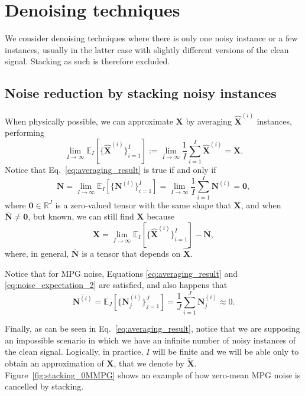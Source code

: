 \documentclass{article}
\begin{document}
\section{Denoising techniques}

We consider denoising techniques where there is only one noisy
instance or a few instances, usually in the latter case with slightly
different versions of the clean signal. Stacking as such is therefore
excluded.

\subsection{Noise reduction by stacking noisy instances}
When physically possible, we can approximate ${\mathbf X}$ by
averaging $\hat{\mathbf X}^{(i)}$ instances, performing
\begin{equation}
  \lim_{I \to \infty} \mathbb{E}_I\left[\{\hat{\mathbf X}^{(i)}\}_{i=1}^I\right] := \lim_{I \to \infty} \frac{1}{I} \sum_{i=1}^I \hat{\mathbf X}^{(i)} = {\mathbf X}.
  \label{eq:averaging_result}
\end{equation}
Notice that Eq.~\ref{eq:averaging_result} is true if and only if
\begin{equation}
  \overline{\mathbf N} = \lim_{I \to \infty}{\mathbb E}_I[\{{\mathbf N^{(i)}}\}_{i=1}^I]=\lim_{I \to \infty}\frac{1}{I} \sum_{i=1}^I {\mathbf N}^{(i)}={\mathbf 0},
  \label{eq:noise_expectation_2}
\end{equation}
where ${\mathbf 0}\in \mathbb{R}^J$ is a zero-valued tensor with the
same shape that $\mathbf{X}$, and when
$\overline{\mathbf N}\ne {\mathbf 0}$, but known, we can still find
${\mathbf X}$ because
\begin{equation}
  {\mathbf X} = \lim_{I \to \infty} \mathbb{E}_I\left[\{\hat{\mathbf X}^{(i)}\}_{i=1}^I\right]  - \overline{\mathbf N},
  \label{eq:averaging_result_with_bias}
\end{equation}
where, in general, $\overline{\mathbf N}$ is a tensor that depends on
$\hat{\mathbf X}$.

Notice that for MPG noise, Equations \ref{eq:averaging_result} and
\ref{eq:noise_expectation_2} are satisfied, and also happens that
\begin{equation}
  \overline{\mathbf{N}^{(i)}} = {\mathbb E}_J[\{{\mathbf N}^{(i)}_j\}_{j=1}^J]=\frac{1}{J} \sum_{i=1}^J {\mathbf N}_j^{(i)}\approx 0.
\end{equation}

Finally, as can be seen in Eq.~\ref{eq:averaging_result}, notice that
we are supposing an impossible scenario in which we have an infinite
number of noisy instances of the clean signal. Logically, in practice,
$I$ will be finite and we will be able only to obtain an approximation
of ${\mathbf X}$, that we denote by $\tilde{\mathbf
  X}$. Figure~\ref{fig:stacking_0MMPG} shows an example of how
zero-mean MPG noise is cancelled by stacking.
  
\end{document}

